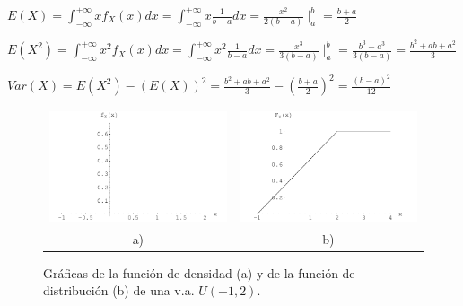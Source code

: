 $E(X)=\int_{-\infty}^{+\infty} x f_X(x) dx=\int_{-\infty}^{+\infty} x \frac{1}{b-a} dx =
\frac{x^2}{2(b-a)}\mid _{a}^{b}=\frac{b+a}{2}$

$E(X^2)=\int_{-\infty}^{+\infty} x^2 f_X(x) dx=\int_{-\infty}^{+\infty} x^2 \frac{1}{b-a}
dx =\frac{x^3}{3(b-a)}\mid_{a}^{b} =\frac{b^3-a^3}{3(b-a)}=\frac{b^2+ab+a^2}{3}$

$Var(X)=E(X^2)-(E(X))^2=\frac{b^2+ab+a^2}{3}-(\frac{b+a}{2})^2=\frac{(b-a)^2}{12}$

\begin{figure}[h]
\begin{center}
\begin{tabular}{cc}       \includegraphics[scale=0.75]{densidaduniforme12}
&

       \includegraphics[scale=0.75]{distribucionuniforme12}\\ a) & b) \end{tabular}
\end{center}
       \caption{ Gráficas de la función de densidad (a)  y de la función de distribución (b) de una v.a. $U(-1,2)$.}
        \end{figure}%
